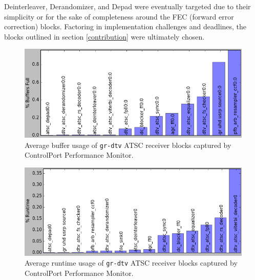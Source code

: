 \documentclass{article}
\begin{document}
Deinterleaver, Derandomizer, and Depad were eventually targeted due to their simplicity or for the sake of completeness around the FEC (forward error correction) blocks. Factoring in implementation challenges and deadlines, the blocks outlined in section \ref{contribution} were ultimately chosen.

\begin{figure}[h]
  \begin{center}
    \centerline{\includegraphics[width=\columnwidth]{gr_buffers.png}}
    \caption{Average buffer usage of {\tt gr-dtv} ATSC receiver blocks captured by ControlPort Performance Monitor.}
    \label{grbuffers}
  \end{center}
\end{figure}

\begin{figure}[h]
  \begin{center}
    \centerline{\includegraphics[width=\columnwidth]{gr_runtime.png}}
    \caption{Average runtime usage of {\tt gr-dtv} ATSC receiver blocks captured by ControlPort Performance Monitor.}
    \label{grruntime}
  \end{center}
\end{figure}
\end{document}
